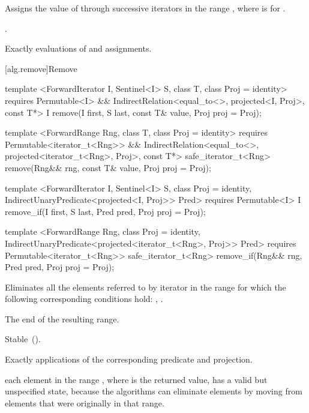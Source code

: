 \begin{itemdescr}
\pnum
\effects
Assigns the value of  through successive iterators in the
range , where  is  for
.

\pnum
\returns
{}.

\pnum
\complexity
Exactly
 evaluations of  and assignments.
\end{itemdescr}

[alg.remove]{Remove}

%
%
\begin{itemdecl}
template <ForwardIterator I, Sentinel<I> S, class T, class Proj = identity>
  requires Permutable<I> &&
    IndirectRelation<equal_to<>, projected<I, Proj>, const T*>
  I remove(I first, S last, const T& value, Proj proj = Proj{});

template <ForwardRange Rng, class T, class Proj = identity>
  requires Permutable<iterator_t<Rng>> &&
    IndirectRelation<equal_to<>, projected<iterator_t<Rng>, Proj>, const T*>
  safe_iterator_t<Rng>
    remove(Rng&& rng, const T& value, Proj proj = Proj{});

template <ForwardIterator I, Sentinel<I> S, class Proj = identity,
    IndirectUnaryPredicate<projected<I, Proj>> Pred>
  requires Permutable<I>
  I remove_if(I first, S last, Pred pred, Proj proj = Proj{});

template <ForwardRange Rng, class Proj = identity,
    IndirectUnaryPredicate<projected<iterator_t<Rng>, Proj>> Pred>
  requires Permutable<iterator_t<Rng>>
  safe_iterator_t<Rng>
    remove_if(Rng&& rng, Pred pred, Proj proj = Proj{});
\end{itemdecl}

\begin{itemdescr}
\pnum
\effects
Eliminates all the elements referred to by iterator
in the range 
for which the following corresponding conditions hold:
,
.

\pnum
\returns
The end of the resulting range.

\pnum
\remarks Stable~().

\pnum
\complexity
Exactly
applications of the corresponding predicate and projection.

\pnum
\realnote each element in the range , where  is
the returned value, has a valid but unspecified state, because the algorithms
can eliminate elements by moving from elements that were originally
in that range.
\end{itemdescr}

